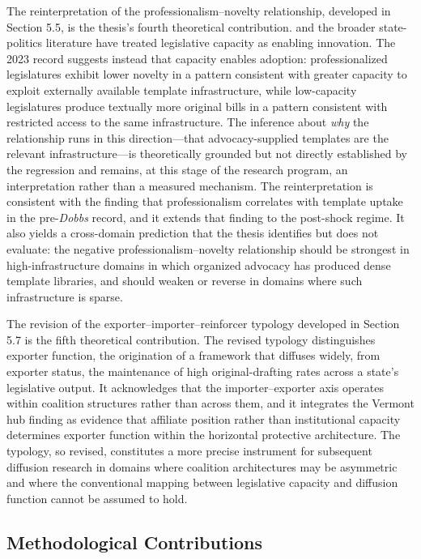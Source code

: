The reinterpretation of the professionalism--novelty relationship, developed in Section 5.5, is the thesis's fourth theoretical contribution. \textcite{squireMeasuringStateLegislative2007} and the broader state-politics literature have treated legislative capacity as enabling innovation. The 2023 record suggests instead that capacity enables adoption: professionalized legislatures exhibit lower novelty in a pattern consistent with greater capacity to exploit externally available template infrastructure, while low-capacity legislatures produce textually more original bills in a pattern consistent with restricted access to the same infrastructure. The inference about \emph{why} the relationship runs in this direction---that advocacy-supplied templates are the relevant infrastructure---is theoretically grounded but not directly established by the regression and remains, at this stage of the research program, an interpretation rather than a measured mechanism. The reinterpretation is consistent with the \textcite{jansaCopyPasteLawmaking2019} finding that professionalism correlates with template uptake in the pre-\textit{Dobbs} record, and it extends that finding to the post-shock regime. It also yields a cross-domain prediction that the thesis identifies but does not evaluate: the negative professionalism--novelty relationship should be strongest in high-infrastructure domains in which organized advocacy has produced dense template libraries, and should weaken or reverse in domains where such infrastructure is sparse.
 
The revision of the exporter--importer--reinforcer typology developed in Section 5.7 is the fifth theoretical contribution. The revised typology distinguishes exporter function, the origination of a framework that diffuses widely, from exporter status, the maintenance of high original-drafting rates across a state's legislative output. It acknowledges that the importer--exporter axis operates within coalition structures rather than across them, and it integrates the Vermont hub finding as evidence that affiliate position rather than institutional capacity determines exporter function within the horizontal protective architecture. The typology, so revised, constitutes a more precise instrument for subsequent diffusion research in domains where coalition architectures may be asymmetric and where the conventional mapping between legislative capacity and diffusion function cannot be assumed to hold.
 
\subsection{Methodological Contributions}
 
